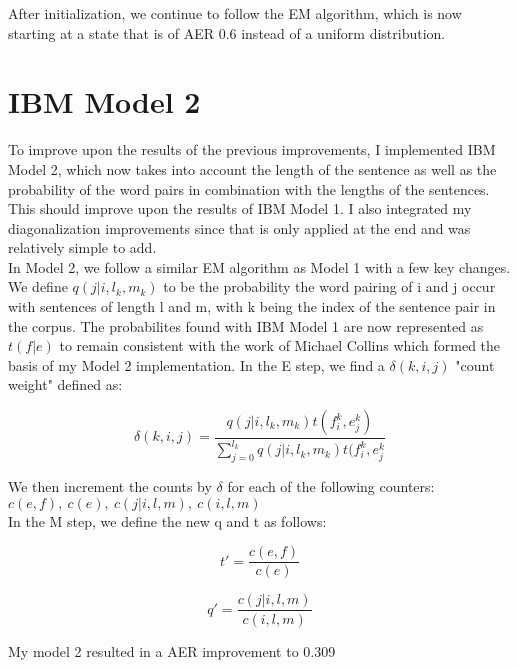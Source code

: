 \documentclass{article}
\begin{document}
After initialization, we continue to follow the EM algorithm, which is now starting at a state that is of AER 0.6 instead of a uniform distribution.

\section{IBM Model 2}

To improve upon the results of the previous improvements, I implemented IBM Model 2, which now takes into account the length of the sentence as well as the probability of the word pairs in combination with the lengths of the sentences. This should improve upon the results of IBM Model 1. I also integrated my diagonalization improvements since that is only applied at the end and was relatively simple to add.\\

In Model 2, we follow a similar EM algorithm as Model 1 with a few key changes. We define $q(j|i,l_k,m_k)$ to be the probability the word pairing of i and j occur with sentences of length l and m, with k being the index of the sentence pair in the corpus. The probabilites found with IBM Model 1 are now represented as $t(f|e)$ to remain consistent with the work of Michael Collins which formed the basis of my Model 2 implementation. In the E step, we find a $\delta(k,i,j)$ "count weight" defined as:

\[
\delta(k,i,j) = \frac{q(j|i,l_k,m_k)t(f^k_i,e^k_j)}{\sum^{l_k}_{j=0}q(j|i,l_k,m_k)t(f^k_i,e^k_j}
\]

We then increment the counts by $\delta$ for each of the following counters:\\
$c(e,f), \ c(e),\ c(j|i,l,m),\ c(i,l,m)$\\

In the M step, we define the new q and t as follows:

\[
t' = \frac{c(e,f)}{c(e)}
\]

\[
q' = \frac{c(j|i,l,m)}{c(i,l,m)}
\]

My model 2 resulted in a AER improvement to 0.309
\end{document}
